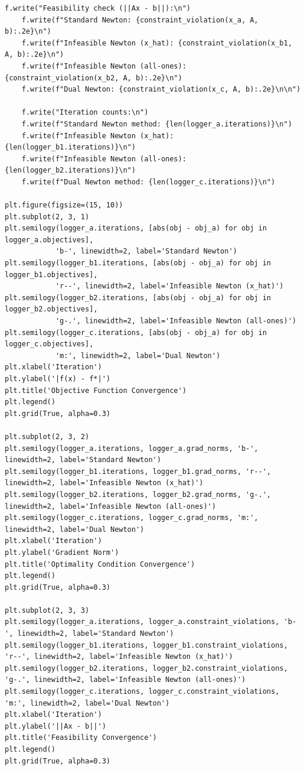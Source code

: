 \documentclass{article}
\newenvironment{solution_cn}{%
  \begin{proof}[解答]%
  \kaishu  %
}{%
  \end{proof}%
}
\begin{document}
\begin{solution_cn}
\begin{lstlisting}[caption={run.py}]
    f.write("Feasibility check (||Ax - b||):\n")
    f.write(f"Standard Newton: {constraint_violation(x_a, A, b):.2e}\n")
    f.write(f"Infeasible Newton (x_hat): {constraint_violation(x_b1, A, b):.2e}\n")
    f.write(f"Infeasible Newton (all-ones): {constraint_violation(x_b2, A, b):.2e}\n")
    f.write(f"Dual Newton: {constraint_violation(x_c, A, b):.2e}\n\n")
    
    f.write("Iteration counts:\n")
    f.write(f"Standard Newton method: {len(logger_a.iterations)}\n")
    f.write(f"Infeasible Newton (x_hat): {len(logger_b1.iterations)}\n")
    f.write(f"Infeasible Newton (all-ones): {len(logger_b2.iterations)}\n")
    f.write(f"Dual Newton method: {len(logger_c.iterations)}\n")

plt.figure(figsize=(15, 10))
plt.subplot(2, 3, 1)
plt.semilogy(logger_a.iterations, [abs(obj - obj_a) for obj in logger_a.objectives], 
            'b-', linewidth=2, label='Standard Newton')
plt.semilogy(logger_b1.iterations, [abs(obj - obj_a) for obj in logger_b1.objectives], 
            'r--', linewidth=2, label='Infeasible Newton (x_hat)')
plt.semilogy(logger_b2.iterations, [abs(obj - obj_a) for obj in logger_b2.objectives], 
            'g-.', linewidth=2, label='Infeasible Newton (all-ones)')
plt.semilogy(logger_c.iterations, [abs(obj - obj_a) for obj in logger_c.objectives], 
            'm:', linewidth=2, label='Dual Newton')
plt.xlabel('Iteration')
plt.ylabel('|f(x) - f*|')
plt.title('Objective Function Convergence')
plt.legend()
plt.grid(True, alpha=0.3)

plt.subplot(2, 3, 2)
plt.semilogy(logger_a.iterations, logger_a.grad_norms, 'b-', linewidth=2, label='Standard Newton')
plt.semilogy(logger_b1.iterations, logger_b1.grad_norms, 'r--', linewidth=2, label='Infeasible Newton (x_hat)')
plt.semilogy(logger_b2.iterations, logger_b2.grad_norms, 'g-.', linewidth=2, label='Infeasible Newton (all-ones)')
plt.semilogy(logger_c.iterations, logger_c.grad_norms, 'm:', linewidth=2, label='Dual Newton')
plt.xlabel('Iteration')
plt.ylabel('Gradient Norm')
plt.title('Optimality Condition Convergence')
plt.legend()
plt.grid(True, alpha=0.3)

plt.subplot(2, 3, 3)
plt.semilogy(logger_a.iterations, logger_a.constraint_violations, 'b-', linewidth=2, label='Standard Newton')
plt.semilogy(logger_b1.iterations, logger_b1.constraint_violations, 'r--', linewidth=2, label='Infeasible Newton (x_hat)')
plt.semilogy(logger_b2.iterations, logger_b2.constraint_violations, 'g-.', linewidth=2, label='Infeasible Newton (all-ones)')
plt.semilogy(logger_c.iterations, logger_c.constraint_violations, 'm:', linewidth=2, label='Dual Newton')
plt.xlabel('Iteration')
plt.ylabel('||Ax - b||')
plt.title('Feasibility Convergence')
plt.legend()
plt.grid(True, alpha=0.3)


\end{lstlisting}
\end{solution_cn}
\end{document}
